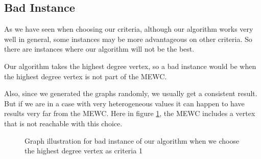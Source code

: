 
\subsection{Bad Instance}

As we have seen when choosing our criteria, although our algorithm works very well in general, some instances may be more advantageous on other criteria. So there are instances where our algorithm will not be the best. 
\bigskip

Our algorithm takes the highest degree vertex, so a bad instance would be when the highest degree vertex is not part of the MEWC. 
\bigskip

Also, since we generated the graphs randomly, we usually get a consistent result. But if we are in a case with very heterogeneous values it can happen to have results very far from the MEWC. Here in figure \ref{fig:bad-instance-vertex-highest-degree1}, the MEWC includes a vertex that is not reachable with this choice.

\begin{center}
    \begin{figure}[H]
        \centering
        \caption{Graph illustration for bad instance of our algorithm when we choose the highest degree vertex as criteria 1}
        \label{fig:bad-instance-vertex-highest-degree1}
    \end{figure}
\end{center}

